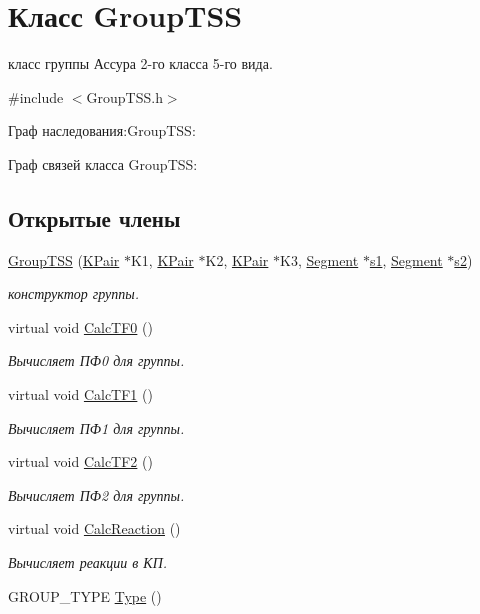\hypertarget{class_group_t_s_s}{
\section{Класс GroupTSS}
\label{class_group_t_s_s}
}


класс группы Ассура 2-\/го класса 5-\/го вида.  




{\ttfamily \#include $<$GroupTSS.h$>$}



Граф наследования:GroupTSS:


Граф связей класса GroupTSS:
\subsection*{Открытые члены}
\begin{DoxyCompactItemize}
\item 
\hyperlink{class_group_t_s_s_a4acee47567553dbbf17a64828339c46a}{GroupTSS} (\hyperlink{class_k_pair}{KPair} $\ast$K1, \hyperlink{class_k_pair}{KPair} $\ast$K2, \hyperlink{class_k_pair}{KPair} $\ast$K3, \hyperlink{class_segment}{Segment} $\ast$\hyperlink{class_group2_a030b303d13894d1b4cc3fff13d0730e3}{s1}, \hyperlink{class_segment}{Segment} $\ast$\hyperlink{class_group2_aa48298daf05b4db8436dedf8d7b151ef}{s2})
\begin{DoxyCompactList}\small\item\em конструктор группы. \item\end{DoxyCompactList}\item 
virtual void \hyperlink{class_group_t_s_s_a40c88ecef947ad1fee24b41437744237}{CalcTF0} ()
\begin{DoxyCompactList}\small\item\em Вычисляет ПФ0 для группы. \item\end{DoxyCompactList}\item 
virtual void \hyperlink{class_group_t_s_s_a58ccee167b9f5c645483d6994fb349f9}{CalcTF1} ()
\begin{DoxyCompactList}\small\item\em Вычисляет ПФ1 для группы. \item\end{DoxyCompactList}\item 
virtual void \hyperlink{class_group_t_s_s_a7eed3e8891c42c57faf6bfe42e3130d8}{CalcTF2} ()
\begin{DoxyCompactList}\small\item\em Вычисляет ПФ2 для группы. \item\end{DoxyCompactList}\item 
virtual void \hyperlink{class_group_t_s_s_af786cc9edf9babaa5cc1c162f714c53a}{CalcReaction} ()
\begin{DoxyCompactList}\small\item\em Вычисляет реакции в КП. \item\end{DoxyCompactList}\item 
GROUP\_\-TYPE \hyperlink{class_group_t_s_s_ab06fa2fd75f4b67888ce585556e8e61f}{Type} ()
\end{DoxyCompactItemize}
